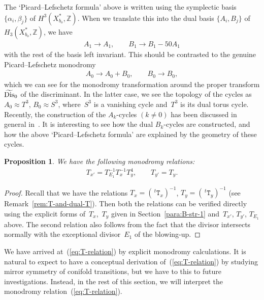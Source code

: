 \documentclass[10pt,a4paper]{amsart}
\numberwithin{equation}{section}
\newtheorem{Proposition}[Theorem]{Proposition}
\begin{document}
\begin{Remark} \label{rem:Remark-TE1} The `Picard--Lefschetz formula' above is written using the symplectic basis $\{ \alpha_{i},\beta_{j}\} $ of $H^{3}(X_{b_{o}}^{*},\mathbb{Z})$. When we translate this into the dual basis $\{ A_{i},B_{j}\}$ of $H_{3}(X_{b_{o}}^{*},\mathbb{Z})$, we have
\begin{gather*}
A_{1}\to A_{1},\qquad B_{1}\to B_{1}-50A_{1}
\end{gather*}
with the rest of the basis left invariant. This should be contrasted to the genuine Picard--Lefschetz monodromy
\begin{gather*}
A_{0}\to A_{0}+B_{0},\qquad B_{0}\to B_{0},
\end{gather*}
which we can see for the monodromy transformation around the proper transform $\widetilde{{\rm Dis}}_{0}$ of the discriminant. In the latter case, we see the topology of the cycles as $A_{0}\approx T^{3}$, $B_{0}\approx S^{3}$, where~$S^{3}$ is a vanishing cycle and~$T^{3}$ is its dual torus cycle. Recently, the construction of the $A_{k}$-cycles $(k\not=0)$ has been discussed in general in~\cite{RuddSie}. It is interesting to see how the dual $B_{k}$-cycles are constructed, and how the above `Picard--Lefschetz formula' are explained by the geometry of these cycles.
\end{Remark}

\begin{Proposition}We have the following monodromy relations:
\begin{gather}
\boxed{T_{x'}=T_{E_{1}}^{-1}T_{x}^{-1}T_{y}^{4},\qquad T_{y'}=T_{y}.}\label{eq:T-relation}
\end{gather}
\end{Proposition}
\begin{proof}Recall that we have the relations $T_{x}=(\,^{t}\mathtt{T}_{x})^{-1}$, $T_{y}=(\,^{t}\mathtt{T}_{y})^{-1}$ (see Remark~\ref{rem:T-and-dual-T}). Then both the relations can be verified directly using the explicit forms of~$T_{x}$,~$T_{y}$ given in Section~\ref{para:B-str-1} and~$T_{x'}$, $T_{y'}$, $T_{E_{1}}$ above. The second relation also follows from the fact that the divisor  intersects normally with the exceptional divisor~$E_{1}$ of the blowing-up.
\end{proof}

We have arrived at~(\ref{eq:T-relation}) by explicit monodromy calculations. It is natural to expect to have a conceptual derivation of~(\ref{eq:T-relation}) by studying mirror symmetry of conifold transitions, but we have to this to future investigations. Instead, in the rest of this section, we will interpret the monodromy relation~(\ref{eq:T-relation}).
\end{document}
